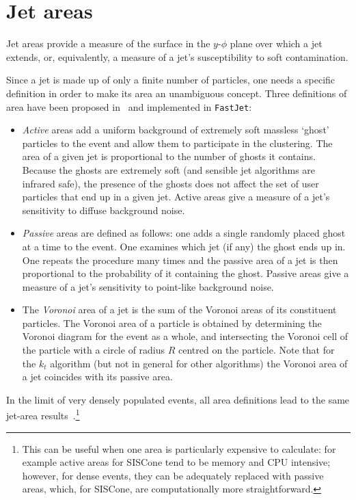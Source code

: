 \documentclass[12pt,a4]{article}
\newcommand{\fastjet}{\texttt{FastJet}\xspace}
\begin{document}
\section{Jet areas}
\label{sec:areas}

Jet areas provide a measure of the surface in the $y$-$\phi$ plane
over which a jet extends, or, equivalently, a measure of a jet's
susceptibility to soft contamination.

Since a jet is made up of only a finite number of particles, one needs
a specific definition in order to make its area an unambiguous
concept. Three definitions of area have been proposed
in~\cite{CSSAreas} and implemented in \fastjet:
\begin{itemize}
\item {\it Active} areas add a uniform background of extremely soft massless
  `ghost' particles to the event and allow them to participate in the
  clustering. The area of a given jet is proportional to the number of
  ghosts it contains. 
  Because the ghosts are extremely soft (and sensible jet algorithms
  are infrared safe), the presence of the ghosts does not affect the
  set of user particles that end up in a given jet.
  Active areas give a measure of a jet's sensitivity to diffuse
  background noise.

\item {\it Passive} areas are defined as follows: one adds a single randomly
  placed ghost at a time to the event. One examines which jet (if any)
  the ghost ends up in. One repeats the procedure many times and the
  passive area of a jet is then proportional to the probability of it
  containing the ghost.
  Passive areas give a measure of a jet's sensitivity to point-like
  background noise.

\item The {\it Voronoi} area of a jet is the sum of the Voronoi areas of its
  constituent particles. The Voronoi area of a particle is obtained by
  determining the Voronoi diagram for the event as a whole, and
  intersecting the Voronoi cell of the particle with a circle of
  radius $R$ centred on the particle. Note that for the $k_t$
  algorithm (but not in general for other algorithms) the Voronoi area
  of a jet coincides with its passive area.
\end{itemize}
In the limit of very densely populated events, all area definitions
lead to the same jet-area results~\cite{CSSAreas}.\footnote{This can
  be useful when one area is particularly expensive to calculate: for
  example active areas for SISCone tend to be memory and CPU
  intensive; however, for dense events, they can be adequately
  replaced with passive areas, which, for SISCone, are computationally
  more straightforward.}
\end{document}
